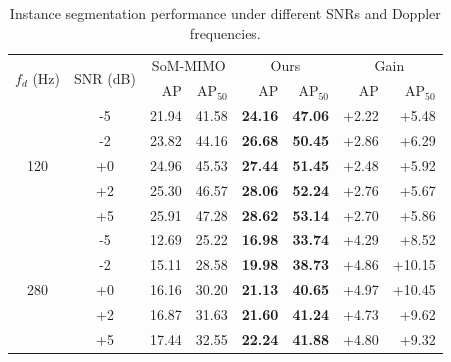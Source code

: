 \begin{table}[t]
\centering
\caption{Instance segmentation performance under different SNRs and Doppler frequencies.}
\label{tab:snr_robustness}
\setlength{\tabcolsep}{3.5pt}
\begin{tabular}{ccrrrrrr}
\toprule
\multirow{2}{*}{$f_d$ (Hz)} & \multirow{2}{*}{SNR (dB)} & \multicolumn{2}{c}{SoM-MIMO} & \multicolumn{2}{c}{Ours} & \multicolumn{2}{c}{Gain} \\ 
 & & AP & AP$_{50}$ & AP & AP$_{50}$ & AP & AP$_{50}$ \\ 
\midrule
\multirow{5}{*}{120} & -5 & 21.94 & 41.58 & \textbf{24.16} & \textbf{47.06} & +2.22 & +5.48 \\
 & -2 & 23.82 & 44.16 & \textbf{26.68} & \textbf{50.45} & +2.86 & +6.29 \\
 & +0 & 24.96 & 45.53 & \textbf{27.44} & \textbf{51.45} & +2.48 & +5.92 \\
 & +2 & 25.30 & 46.57 & \textbf{28.06} & \textbf{52.24} & +2.76 & +5.67 \\
 & +5 & 25.91 & 47.28 & \textbf{28.62} & \textbf{53.14} & +2.70 & +5.86 \\
\midrule
\multirow{5}{*}{280} & -5 & 12.69 & 25.22 & \textbf{16.98} & \textbf{33.74} & +4.29 & +8.52 \\
 & -2 & 15.11 & 28.58 & \textbf{19.98} & \textbf{38.73} & +4.86 & +10.15 \\
 & +0 & 16.16 & 30.20 & \textbf{21.13} & \textbf{40.65} & +4.97 & +10.45 \\
 & +2 & 16.87 & 31.63 & \textbf{21.60} & \textbf{41.24} & +4.73 & +9.62 \\
 & +5 & 17.44 & 32.55 & \textbf{22.24} & \textbf{41.88} & +4.80 & +9.32 \\
\bottomrule
\end{tabular}
\end{table}
